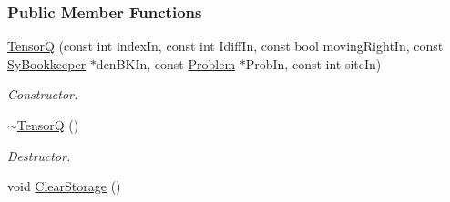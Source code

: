 \subsubsection*{Public Member Functions}
\begin{DoxyCompactItemize}
\item 
\hyperlink{classCheMPS2_1_1TensorQ_a29123b1ef23fbbdcf7d29d5c60b11b9f}{Tensor\-Q} (const int index\-In, const int Idiff\-In, const bool moving\-Right\-In, const \hyperlink{classCheMPS2_1_1SyBookkeeper}{Sy\-Bookkeeper} $\ast$den\-B\-K\-In, const \hyperlink{classCheMPS2_1_1Problem}{Problem} $\ast$Prob\-In, const int site\-In)
\begin{DoxyCompactList}\small\item\em Constructor. \end{DoxyCompactList}\item 
\hypertarget{classCheMPS2_1_1TensorQ_ab61a16cadc17ff60870be54d27216f9f}{\hyperlink{classCheMPS2_1_1TensorQ_ab61a16cadc17ff60870be54d27216f9f}{$\sim$\-Tensor\-Q} ()}\label{classCheMPS2_1_1TensorQ_ab61a16cadc17ff60870be54d27216f9f}

\begin{DoxyCompactList}\small\item\em Destructor. \end{DoxyCompactList}\item 
\hypertarget{classCheMPS2_1_1TensorQ_aa8b8725cc9529f5954b7c16398fa7b00}{void \hyperlink{classCheMPS2_1_1TensorQ_aa8b8725cc9529f5954b7c16398fa7b00}{Clear\-Storage} ()}\label{classCheMPS2_1_1TensorQ_aa8b8725cc9529f5954b7c16398fa7b00}


\end{DoxyCompactItemize}
